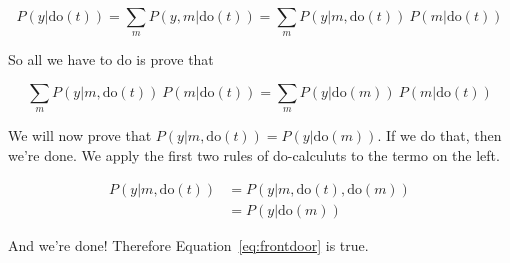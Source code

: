 \documentclass[a4paper]{article}
\begin{document}
\begin{equation}
    P(y | \mathrm{do} (t)) = \sum_{m} P(y, m | \mathrm{do} (t)) = \sum_m P(y | m, \mathrm{do} (t)) ~ P(m | \mathrm{do} (t))
\end{equation}

So all we have to do is prove that

\begin{equation}
    \sum_m P(y | m, \mathrm{do} (t)) ~ P(m | \mathrm{do} (t)) = \sum_{m} P(y | \mathrm{do} (m)) ~ P(m | \mathrm{do} (t))
    \label{eq:frontdoor}
\end{equation}

We will now prove that $P(y | m, \mathrm{do} (t)) = P(y | \mathrm{do} (m))$. If we do that, then we're done. We apply the first two rules of do-calculuts to the termo on the left.

\begin{align}
    P(y | m, \mathrm{do} (t)) &= P(y | m, \mathrm{do} (t), \mathrm{do} (m)) \\
    &= P(y | \mathrm{do} (m))
\end{align}

And we're done! Therefore Equation~\ref{eq:frontdoor} is true.
\end{document}
